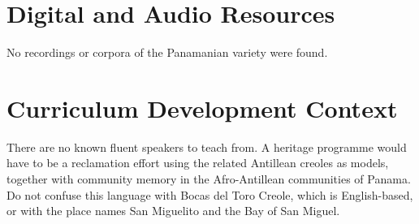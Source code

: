 \documentclass[12pt]{article}
\begin{document}
\section{Digital and Audio Resources}
No recordings or corpora of the Panamanian variety were found.

\section{Curriculum Development Context}
There are no known fluent speakers to teach from. A heritage programme would have to be a reclamation effort using the related Antillean creoles as models, together with community memory in the Afro-Antillean communities of Panama. Do not confuse this language with Bocas del Toro Creole, which is English-based, or with the place names San Miguelito and the Bay of San Miguel.
\end{document}
